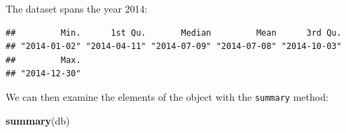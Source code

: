 \documentclass[]{book}
\newenvironment{Shaded}{\begin{snugshade}}{\end{snugshade}}
\newcommand{\CommentTok}[1]{\textcolor[rgb]{0.56,0.35,0.01}{\textit{#1}}}
\newcommand{\KeywordTok}[1]{\textcolor[rgb]{0.13,0.29,0.53}{\textbf{#1}}}
\newcommand{\NormalTok}[1]{#1}
\newcommand{\OperatorTok}[1]{\textcolor[rgb]{0.81,0.36,0.00}{\textbf{#1}}}
\newcommand{\StringTok}[1]{\textcolor[rgb]{0.31,0.60,0.02}{#1}}
\begin{document}
The dataset spans the year 2014:

\begin{Shaded}
\end{Shaded}

\begin{verbatim}
##         Min.      1st Qu.       Median         Mean      3rd Qu. 
## "2014-01-02" "2014-04-11" "2014-07-09" "2014-07-08" "2014-10-03" 
##         Max. 
## "2014-12-30"
\end{verbatim}

We can then examine the elements of the object with the \texttt{summary} method:

\begin{Shaded}
\begin{Highlighting}[]
\KeywordTok{summary}\NormalTok{(db)}
\end{Highlighting}
\end{Shaded}
\end{document}

